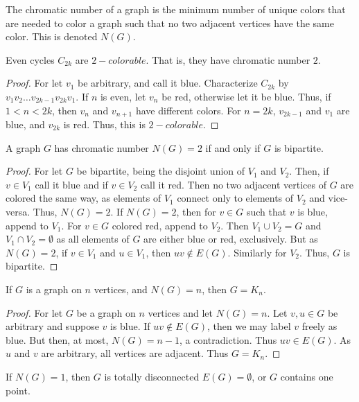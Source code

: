 \documentclass[crop=false,class=book]{standalone}
\begin{document}
\begin{definition}
The chromatic number of a graph is the minimum number of unique colors that are needed to color a graph such that no two adjacent vertices have the same color. This is denoted $N(G)$.
\end{definition}
\begin{theorem}
Even cycles $C_{2k}$ are $2-colorable$. That is, they have chromatic number $2$.
\end{theorem}
\begin{proof}
For let $v_1$ be arbitrary, and call it blue. Characterize $C_{2k}$ by $v_1 v_2 \hdots v_{2k-1}v_{2k} v_1$. If $n$ is even, let $v_n$ be red, otherwise let it be blue. Thus, if $1<n<2k$, then $v_n$ and $v_{n+1}$ have different colors. For $n=2k$, $v_{2k-1}$ and $v_1$ are blue, and $v_{2k}$ is red. Thus, this is $2-colorable$.
\end{proof}
\begin{theorem}
A graph $G$ has chromatic number $N(G)=2$ if and only if $G$ is bipartite.
\end{theorem}
\begin{proof}
For let $G$ be bipartite, being the disjoint union of $V_1$ and $V_2$. Then, if $v\in V_1$ call it blue and if $v\in V_2$ call it red. Then no two adjacent vertices of $G$ are colored the same way, as elements of $V_1$ connect only to elements of $V_2$ and vice-versa. Thus, $N(G)=2$. If $N(G)=2$, then for $v\in G$ such that $v$ is blue, append to $V_1$. For $v\in G$ colored red, append to $V_2$. Then $V_1\cup V_2 = G$ and $V_1\cap V_2 = \emptyset$ as all elements of $G$ are either blue or red, exclusively. But as $N(G)=2$, if $v\in V_1$ and $u\in V_1$, then $uv\notin E(G)$. Similarly for $V_2$. Thus, $G$ is bipartite.
\end{proof}
\begin{theorem}
If $G$ is a graph on $n$ vertices, and $N(G) = n$, then $G= K_n$.
\end{theorem}
\begin{proof}
For let $G$ be a graph on $n$ vertices and let $N(G) = n$. Let $v,u\in G$ be arbitrary and suppose $v$ is blue. If $uv\notin E(G)$, then we may label $v$ freely as blue. But then, at most, $N(G)=n-1$, a contradiction. Thus $uv\in E(G)$. As $u$ and $v$ are arbitrary, all vertices are adjacent. Thus $G=K_n$.
\end{proof}
\begin{corollary}
If $N(G) = 1$, then $G$ is totally disconnected $E(G)=\emptyset$, or $G$ contains one point.
\end{corollary}
\end{document}
